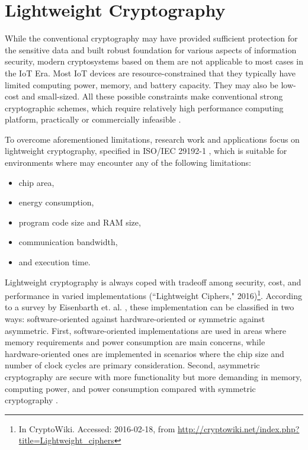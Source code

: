
\section{Lightweight Cryptography}
\label{sec:crypto}

While the conventional cryptography may have provided sufficient protection for the sensitive data and built robust foundation for various aspects of information security, modern cryptosystems based on them are not applicable to most cases in the \gls{IoT} Era. Most \gls{IoT} devices are resource-constrained that they typically have limited computing power, memory, and battery capacity. They may also be low-cost and small-sized. All these possible constraints make conventional strong cryptographic schemes, which require relatively high performance computing platform, practically or commercially infeasible \cite{cisco:iot-pf}. 

To overcome aforementioned limitations, research work and applications focus on lightweight cryptography, specified in ISO/IEC 29192-1 \cite{ISO29192-1:2012}, which is suitable for environments where may encounter any of the following limitations:
\begin{itemize}
\item chip area,
\item energy consumption,
\item program code size and RAM size,
\item communication bandwidth,
\item and execution time.
\end{itemize}

Lightweight cryptography is always coped with tradeoff among security, cost, and performance in varied implementations (\textquotedblleft Lightweight Ciphers," 2016)\footnote{In CryptoWiki. Accessed: 2016-02-18, from \url{http://cryptowiki.net/index.php?title=Lightweight_ciphers}}. According to a survey by Eisenbarth et. al. \cite{Eisenbarth:2007}, these implementation can be classified in two ways: software-oriented against hardware-oriented or symmetric against asymmetric. First, software-oriented implementations are used in areas where memory requirements and power consumption are main concerns, while hardware-oriented ones are implemented in scenarios where the chip size and number of clock cycles are primary consideration. Second, asymmetric cryptography are secure with more functionality but more demanding in memory, computing power, and power consumption compared with symmetric cryptography \cite{Tripathi:2014}.

